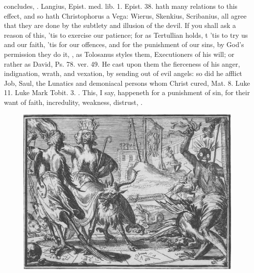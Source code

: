{{concludes, . Langius, Epist. med. lib. 1. Epist. 38. hath many relations to this effect, and
so hath Christophorus a Vega: Wierus, Skenkius, Scribanius, all agree
that they are done by the subtlety and illusion of the devil. If you
shall ask a reason of this, 'tis to exercise our patience; for as
Tertullian holds, t 'tis to try us and our
faith, 'tis for our offences, and for the punishment of our sins, by
God's permission they do it, , as
Tolosanus styles them, Executioners of his will; or rather as
David, Ps. 78. ver. 49. He cast upon them the fierceness of his anger,
indignation, wrath, and vexation, by sending out of evil angels: so did
he afflict Job, Saul, the Lunatics and demoniacal persons whom Christ
cured, Mat.  8. Luke  11. Luke  Mark  Tobit.  3. \etc{}.
This, I say, happeneth for a punishment of sin, for their want of
faith, incredulity, weakness, distrust, \etc{}.

\cleartoleftpage{}
\begin{figure}[p]
  \begingroup
  \centering
  \includegraphics[keepaspectratio,width=\textwidth]{figures/DeHorlende-small.jpg}
  \label{fig:dehorlende}
\end{figure}

\clearpage{}
\thispagestyle{titleontop}

}}
